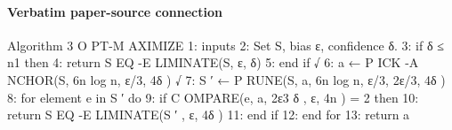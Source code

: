 \documentclass[10pt]{article}
\begin{document}
\paragraph{Verbatim paper-source connection}
\begin{ReviewVerbatim}
Algorithm 3 O PT-M AXIMIZE
 1: inputs
 2:    Set S, bias ε, confidence δ.
 3: if δ ≤ n1 then
 4:    return S EQ -E LIMINATE(S, ε, δ)
 5: end if                    √
 6: a ← P ICK -A NCHOR(S, 6n log n, ε/3, 4δ )
                         √
 7: S ′ ← P RUNE(S, a, 6n log n, ε/3, 2ε/3, 4δ )
 8: for element e in S ′ do
 9:    if C OMPARE(e, a, 2ε3
                                   δ
                             , ε, 4n ) = 2 then
10:      return S EQ -E LIMINATE(S ′ , ε, 4δ )
11:   end if
12: end for
13: return a
\end{ReviewVerbatim}
\end{document}
